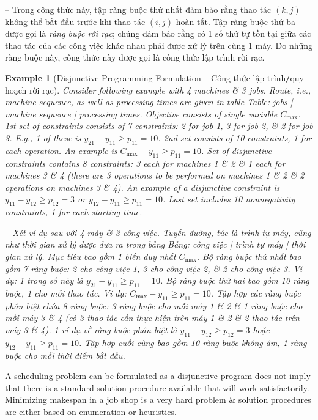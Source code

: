 \documentclass{article}
\newtheorem{example}{Example}
\begin{document}
\begin{itemize}
\begin{itemize}
        -- Trong công thức này, tập ràng buộc thứ nhất đảm bảo rằng thao tác $(k,j)$ không thể bắt đầu trước khi thao tác $(i,j)$ hoàn tất. Tập ràng buộc thứ ba được gọi là {\it ràng buộc rời rạc}; chúng đảm bảo rằng có 1 số thứ tự tồn tại giữa các thao tác của các công việc khác nhau phải được xử lý trên cùng 1 máy. Do những ràng buộc này, công thức này được gọi là công thức lập trình rời rạc.

        \begin{example}[Disjunctive Programming Formulation -- Công thức lập trình{\tt/}quy hoạch rời rạc]
            Consider following example with 4 machines \& 3 jobs. Route, i.e., machine sequence, as well as processing times are given in table {\sf Table: jobs | machine sequence | processing times}. Objective consists of single variable $C_{\max}$. 1st set of constraints consists of 7 constraints: 2 for job 1, 3 for job 2, \& 2 for job 3. E.g., 1 of these is $y_{21} - y_{11}\ge p_{11} = 10$. 2nd set consists of 10 constraints, 1 for each operation. An example is $C_{\max} - y_{11}\ge p_{11} = 10$. Set of disjunctive constraints contains 8 constraints: 3 each for machines 1 \& 2 \& 1 each for machines 3 \& 4 (there are 3 operations to be performed on machines 1 \& 2 \& 2 operations on machines 3 \& 4). An example of a disjunctive constraint is $y_{11} - y_{12}\ge p_{12} = 3$ or $y_{12} - y_{11}\ge p_{11} = 10$. Last set includes 10 nonnegativity constraints, 1 for each starting time.

            -- Xét ví dụ sau với 4 máy \& 3 công việc. Tuyến đường, tức là trình tự máy, cũng như thời gian xử lý được đưa ra trong bảng {\sf Bảng: công việc | trình tự máy | thời gian xử lý}. Mục tiêu bao gồm 1 biến duy nhất $C_{\max}$. Bộ ràng buộc thứ nhất bao gồm 7 ràng buộc: 2 cho công việc 1, 3 cho công việc 2, \& 2 cho công việc 3. Ví dụ: 1 trong số này là $y_{21} - y_{11}\ge p_{11} = 10$. Bộ ràng buộc thứ hai bao gồm 10 ràng buộc, 1 cho mỗi thao tác. Ví dụ: $C_{\max} - y_{11}\ge p_{11} = 10$. Tập hợp các ràng buộc phân biệt chứa 8 ràng buộc: 3 ràng buộc cho mỗi máy 1 \& 2 \& 1 ràng buộc cho mỗi máy 3 \& 4 (có 3 thao tác cần thực hiện trên máy 1 \& 2 \& 2 thao tác trên máy 3 \& 4). 1 ví dụ về ràng buộc phân biệt là $y_{11} - y_{12}\ge p_{12} = 3$ hoặc $y_{12} - y_{11}\ge p_{11} = 10$. Tập hợp cuối cùng bao gồm 10 ràng buộc không âm, 1 ràng buộc cho mỗi thời điểm bắt đầu.
        \end{example}
        A scheduling problem can be formulated as a disjunctive program does not imply that there is a standard solution procedure available that will work satisfactorily. Minimizing makespan in a job shop is a very hard problem \& solution procedures are either based on enumeration or heuristics.


\end{itemize}
\end{itemize}
\end{document}
